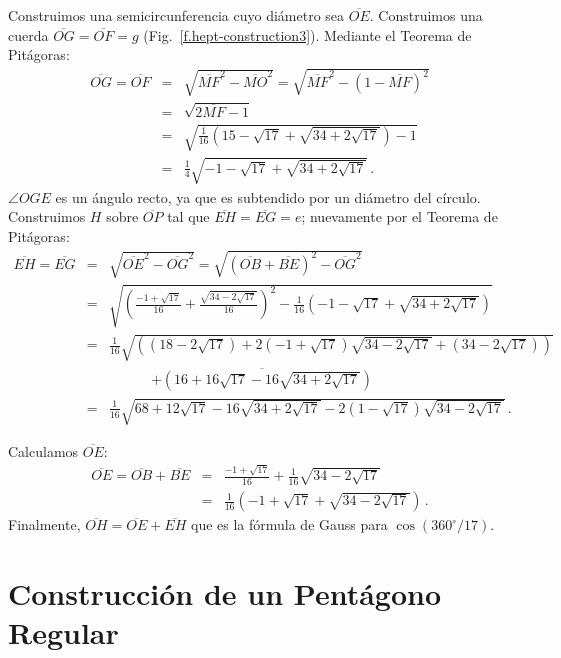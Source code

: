 Construimos una semicircunferencia cuyo diámetro sea $\overline{OE}$. Construimos una cuerda $\overline{OG}=\overline{OF}=g$ (Fig.~\ref{f.hept-construction3}). Mediante el Teorema de Pitágoras:
\begin{eqnarray*}
\overline{OG}=\overline{OF}&=&\sqrt{\overline{MF}^2-\overline{MO}^2}=\sqrt{\overline{MF}^2-(1-\overline{MF})^2}\\
&=&\sqrt{2\overline{MF}-1}\\
&=&\sqrt{\frac{1}{16}\left(15-\sqrt{17}+\sqrt{34+2\sqrt{17}}\right)-1}\\
&=&\frac{1}{4}\sqrt{-1-\sqrt{17}+\sqrt{34+2\sqrt{17}}}\,.
\end{eqnarray*}
$\angle OGE$ es un ángulo recto, ya que es subtendido por un diámetro del círculo. Construimos $H$ sobre $\overline{OP}$ tal que $\overline{EH}=\overline{EG}=e$; nuevamente por el Teorema de Pitágoras:
\begin{eqnarray*}
\overline{EH}=\overline{EG}&=&\sqrt{\overline{OE}^2-\overline{OG}^2}=\sqrt{(\overline{OB}+\overline{BE})^2-\overline{OG}^2}\\
&=&\sqrt{\left(\frac{-1+\sqrt{17}}{16}+\frac{\sqrt{34-2\sqrt{17}}}{16}\right)^2-
\frac{1}{16}\left(-1-\sqrt{17}+\sqrt{34+2\sqrt{17}}\right)}
\\
&=&\frac{1}{16}\sqrt{\left(
(18-2\sqrt{17})+ 2(-1+\sqrt{17})\sqrt{34-2\sqrt{17}}+
(34-2\sqrt{17})\right)}\\
&&\quad\quad\quad\overline{
+\left(16+16\sqrt{17}-16\sqrt{34+2\sqrt{17}}\right)}\\
&=&\frac{1}{16}\sqrt{
68+12\sqrt{17}-16\sqrt{34+2\sqrt{17}}-2(1-\sqrt{17})\sqrt{34-2\sqrt{17}}
}\,.
\end{eqnarray*}

Calculamos $\overline{OE}$:
\begin{eqnarray*}
\overline{OE}=\overline{OB}+\overline{BE}&=&\frac{-1+\sqrt{17}}{16}+\frac{1}{16}\sqrt{34-2\sqrt{17}}\\
&=&\frac{1}{16}\left(-1+\sqrt{17}+\sqrt{34-2\sqrt{17}}\right)\,.
\end{eqnarray*}
Finalmente, $\overline{OH}=\overline{OE}+\overline{EH}$ que es la fórmula de Gauss para $\cos (360^\circ/17)$.

\section{Construcción de un Pentágono Regular}\label{s.hept-pentagon}

